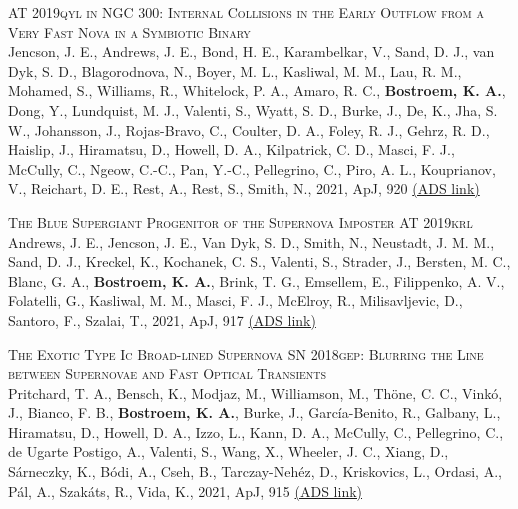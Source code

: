\begin{revnumerate}[67]
    \item{\textsc{AT 2019qyl in NGC 300: Internal Collisions in the Early Outflow from a Very Fast Nova in a Symbiotic Binary}\\ 
    Jencson, J. E., Andrews, J. E., Bond, H. E., Karambelkar, V., Sand, D. J., van Dyk, S. D., Blagorodnova, N., Boyer, M. L., Kasliwal, M. M., Lau, R. M., Mohamed, S., Williams, R., Whitelock, P. A., Amaro, R. C., \textbf{Bostroem, K. A.}, Dong, Y., Lundquist, M. J., Valenti, S., Wyatt, S. D., Burke, J., De, K., Jha, S. W., Johansson, J., Rojas-Bravo, C., Coulter, D. A., Foley, R. J., Gehrz, R. D., Haislip, J., Hiramatsu, D., Howell, D. A., Kilpatrick, C. D., Masci, F. J., McCully, C., Ngeow, C.-C., Pan, Y.-C., Pellegrino, C., Piro, A. L., Kouprianov, V., Reichart, D. E., Rest, A., Rest, S., Smith, N., 2021, ApJ, 920 
    \color{blue}\href{https://ui.adsabs.harvard.edu/abs/2021ApJ...920..127J}{(ADS link)}\color{black}}\\
    
    \item{\textsc{The Blue Supergiant Progenitor of the Supernova Imposter AT 2019krl}\\ 
    Andrews, J. E., Jencson, J. E., Van Dyk, S. D., Smith, N., Neustadt, J. M. M., Sand, D. J., Kreckel, K., Kochanek, C. S., Valenti, S., Strader, J., Bersten, M. C., Blanc, G. A., \textbf{Bostroem, K. A.}, Brink, T. G., Emsellem, E., Filippenko, A. V., Folatelli, G., Kasliwal, M. M., Masci, F. J., McElroy, R., Milisavljevic, D., Santoro, F., Szalai, T., 2021, ApJ, 917 
    \color{blue}\href{https://ui.adsabs.harvard.edu/abs/2021ApJ...917...63A}{(ADS link)}\color{black}}\\
    
    \item{\textsc{The Exotic Type Ic Broad-lined Supernova SN 2018gep: Blurring the Line between Supernovae and Fast Optical Transients}\\ 
    Pritchard, T. A., Bensch, K., Modjaz, M., Williamson, M., Thöne, C. C., Vink\'{o}, J., Bianco, F. B., \textbf{Bostroem, K. A.}, Burke, J., Garc\'{i}a-Benito, R., Galbany, L., Hiramatsu, D., Howell, D. A., Izzo, L., Kann, D. A., McCully, C., Pellegrino, C., de Ugarte Postigo, A., Valenti, S., Wang, X., Wheeler, J. C., Xiang, D., Sárneczky, K., Bódi, A., Cseh, B., Tarczay-Neh\'{e}z, D., Kriskovics, L., Ordasi, A., Pál, A., Szakáts, R., Vida, K., 2021, ApJ, 915 
    \color{blue}\href{https://ui.adsabs.harvard.edu/abs/2021ApJ...915..121P}{(ADS link)}\color{black}}\\
    

\end{revnumerate}
